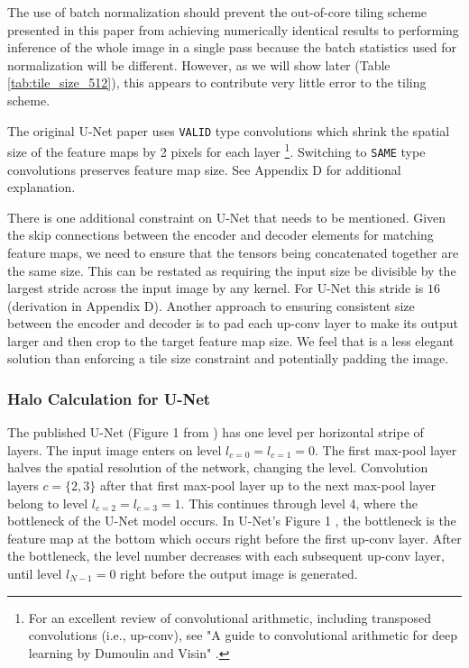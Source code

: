 \documentclass[runningheads]{llncs}
\begin{document}
The use of batch normalization should prevent the out-of-core tiling scheme presented in this paper from achieving numerically identical results to performing inference of the whole image in a single pass because the batch statistics used for normalization will be different. However, as we will show later (Table \ref{tab:tile_size_512}), this appears to contribute very little error to the tiling scheme. 

The original U-Net paper uses \texttt{VALID} type convolutions which shrink the spatial size of the feature maps by 2 pixels for each layer \cite{Dumoulin2018}\footnote{For an excellent review of convolutional arithmetic, including transposed convolutions (i.e., up-conv), see "A guide to convolutional arithmetic for deep learning by Dumoulin and Visin" \cite{Dumoulin2018}.}. Switching to \texttt{SAME} type convolutions preserves feature map size. See Appendix D for additional explanation. 

There is one additional constraint on U-Net that needs to be mentioned. Given the skip connections between the encoder and decoder elements for matching feature maps, we need to ensure that the tensors being concatenated together are the same size. This can be restated as requiring the input size be divisible by the largest stride across the input image by any kernel. For U-Net this stride is $16$ (derivation in Appendix D). Another approach to ensuring consistent size between the encoder and decoder is to pad each up-conv layer to make its output larger and then crop to the target feature map size. We feel that is a less elegant solution than enforcing a tile size constraint and potentially padding the image. 


\subsubsection{Halo Calculation for U-Net}

The published U-Net (Figure 1 from \cite{Ronneberger2015a}) has one level per horizontal stripe of layers. The input image enters on level $l_{c=0} = l_{c=1} = 0$. The first max-pool layer halves the spatial resolution of the network, changing the level. Convolution layers $c = \{2, 3\}$ after that first max-pool layer up to the next max-pool layer belong to level $l_{c=2}=l_{c=3} = 1$. This continues through level 4, where the bottleneck of the U-Net model occurs. In U-Net's Figure 1 \cite{Ronneberger2015a}, the bottleneck is the feature map at the bottom which occurs right before the first up-conv layer. After the bottleneck, the level number decreases with each subsequent up-conv layer, until level $l_{N-1} = 0$ right before the output image is generated. 
\end{document}
